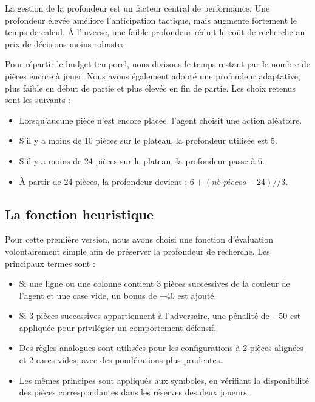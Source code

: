 La gestion de la profondeur est un facteur central de performance. Une profondeur élevée améliore l'anticipation tactique, mais augmente fortement le temps de calcul. À l'inverse, une faible profondeur réduit le coût de recherche au prix de décisions moins robustes.

Pour répartir le budget temporel, nous divisons le temps restant par le nombre de pièces encore à jouer. Nous avons également adopté une profondeur adaptative, plus faible en début de partie et plus élevée en fin de partie. Les choix retenus sont les suivants :\\

\begin{itemize}
    \item Lorsqu'aucune pièce n'est encore placée, l'agent choisit une action aléatoire.

    \item S'il y a moins de 10 pièces sur le plateau, la profondeur utilisée est 5.

    \item S'il y a moins de 24 pièces sur le plateau, la profondeur passe à 6.

    \item À partir de 24 pièces, la profondeur devient : $6 + (nb\_pieces - 24) // 3$.
\end{itemize}

\subsection{La fonction heuristique}

Pour cette première version, nous avons choisi une fonction d'évaluation volontairement simple afin de préserver la profondeur de recherche. Les principaux termes sont :\\

\begin{itemize}
    \item Si une ligne ou une colonne contient 3 pièces successives de la couleur de l'agent et une case vide, un bonus de $+40$ est ajouté.
    
    \item Si 3 pièces successives appartiennent à l'adversaire, une pénalité de $-50$ est appliquée pour privilégier un comportement défensif.
    
    \item Des règles analogues sont utilisées pour les configurations à 2 pièces alignées et 2 cases vides, avec des pondérations plus prudentes.
    
    \item Les mêmes principes sont appliqués aux symboles, en vérifiant la disponibilité des pièces correspondantes dans les réserves des deux joueurs.
\end{itemize}

